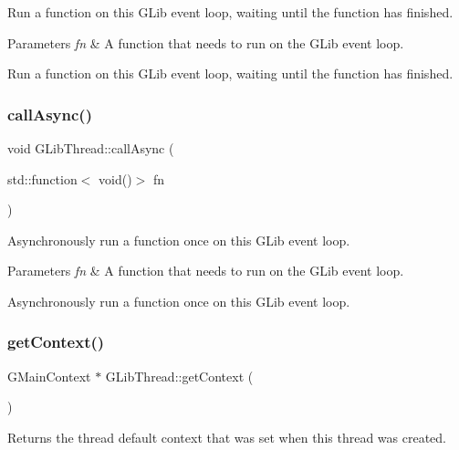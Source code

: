 Run a function on this G\+Lib event loop, waiting until the function has finished.


\begin{DoxyParams}{Parameters}
{\em fn} & A function that needs to run on the G\+Lib event loop.\\
\hline
\end{DoxyParams}
Run a function on this G\+Lib event loop, waiting until the function has finished. \mbox{\label{classGLibThread_aa31afcc7fc630ad32aab01852f3d2e9a}} 
\subsubsection{\texorpdfstring{call\+Async()}{callAsync()}}
{\footnotesize\ttfamily void G\+Lib\+Thread\+::call\+Async (\begin{DoxyParamCaption}\item[{std\+::function$<$ void()$>$}]{fn }\end{DoxyParamCaption})}

Asynchronously run a function once on this G\+Lib event loop.


\begin{DoxyParams}{Parameters}
{\em fn} & A function that needs to run on the G\+Lib event loop.\\
\hline
\end{DoxyParams}
Asynchronously run a function once on this G\+Lib event loop. \mbox{\label{classGLibThread_a27a5c316c4b927d48534d023fe4c4029}} 
\subsubsection{\texorpdfstring{get\+Context()}{getContext()}}
{\footnotesize\ttfamily G\+Main\+Context $\ast$ G\+Lib\+Thread\+::get\+Context (\begin{DoxyParamCaption}{ }\end{DoxyParamCaption})}

Returns the thread default context that was set when this thread was created. \mbox{\label{classGLibThread_a48e06a164ff2bb673d115fad34706cbd}} 
